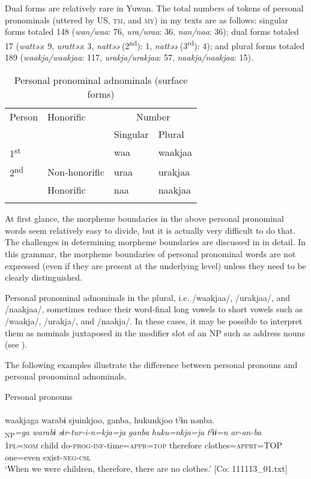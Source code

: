 Dual forms are relatively rare in Yuwan. The total numbers of tokens of personal pronominals (uttered by US, \textsc{tm}, and \textsc{my}) in my texts are as follows: singular forms totaled 148 (\textit{wan/waa}: 76, \textit{ura/uraa}: 36, \textit{nan/naa}: 36); dual forms totaled 17 (\textit{wattəə}: 9, \textit{urattəə}: 3, \textit{nattəə} (2\textsuperscript{nd}): 1, \textit{nattəə} (3\textsuperscript{rd}): 4); and plural forms totaled 189 (\textit{waakja/waakjaa}: 117, \textit{urakja/urakjaa}: 57, \textit{naakja/naakjaa}: 15).

\begin{table}
\caption{\label{tab:key:32}Personal pronominal adnominals (surface forms)}
\begin{tabular}{llll}
\lsptoprule
Person  & Honorific & \multicolumn{2}{c}{Number}\\\cmidrule(lr){3-4}
        &           &    Singular  & Plural\\\midrule
1\textsuperscript{st} & & waa & waakjaa\\
2\textsuperscript{nd} & Non-honorific & uraa & urakjaa\\
                      & Honorific     & naa  & naakjaa\\\lspbottomrule
\end{tabular}
\end{table}

At first glance, the morpheme boundaries in the above personal pronominal words seem relatively easy to divide, but it is actually very difficult to do that. The challenges in determining morpheme boundaries are discussed in  in detail. In this grammar, the morpheme boundaries of personal pronominal words are not expressed (even if they are present at the underlying level) unless they need to be clearly distinguished.

Personal pronominal adnominals in the plural, i.e. /waakjaa/, /urakjaa/, and /naakjaa/, sometimes reduce their word-final long vowels to short vowels such as /waakja/, /urakja/, and /naakja/. In these cases, it may be possible to interpret them as nominals juxtaposed in the modifier slot of an NP such as address nouns (see ).

  The following examples illustrate the difference between personal pronouns and personal pronominal adnominals.

\ea \label{ex:5:1}  \ea \label{ex:5:1a} Personal pronouns\\\\
\glll  waakjaga  warabɨ  sjuinkjoo,  ganba,  hukunkjoo  tˀɨn  nənba.\\
[\textit{waakja}\textsubscript{Head}]\textsubscript{NP}\textit{=ga}  \textit{warabɨ}  \textit{sɨr-tur-i-n=kja=ja}  \textit{ganba} \textit{huku=nkja=ja}  \textit{tˀɨɨ=n}  \textit{ar-an-ba}\\
1\textsc{pl}=\textsc{nom}  child  do-\textsc{prog}-\textsc{inf}-time=\textsc{appr}=\textsc{top}  therefore   clothes=\textsc{apprt}=TOP  one=even  exist-\textsc{neg}-\textsc{csl}\\
\glt ‘When we were children, therefore, there are no clothes.’ [Co: 111113\_01.txt]

